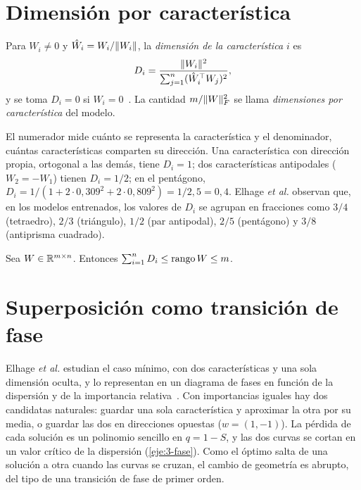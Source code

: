 \section{Dimensión por característica}

\begin{definicion}\label{def:dimension}
Para $W_i\neq 0$ y $\hat W_i=W_i/\lVert W_i\rVert$, la \emph{dimensión de la característica $i$} es
\[
D_i=\frac{\lVert W_i\rVert^{2}}{\sum_{j=1}^{n}(\hat W_i^{\top} W_j)^{2}},
\]
y se toma $D_i=0$ si $W_i=0$~\cite[«Feature Dimensionality»]{elhage22}. La cantidad $m/\lVert W\rVert_F^{2}$ se llama \emph{dimensiones por característica} del modelo.
\end{definicion}

El numerador mide cuánto se representa la característica y el denominador, cuántas características comparten su dirección. Una característica con dirección propia, ortogonal a las demás, tiene $D_i=1$; dos características antipodales ($W_2=-W_1$) tienen $D_i=1/2$; en el pentágono, $D_i=1/(1+2\cdot 0{,}309^{2}+2\cdot 0{,}809^{2})=1/2{,}5=0{,}4$. Elhage \emph{et al.} observan que, en los modelos entrenados, los valores de $D_i$ se agrupan en fracciones como $3/4$ (tetraedro), $2/3$ (triángulo), $1/2$ (par antipodal), $2/5$ (pentágono) y $3/8$ (antiprisma cuadrado).

\begin{proposicion}\label{prop:suma-dim}
Sea $W\in\mathbb{R}^{m\times n}$. Entonces $\sum_{i=1}^{n}D_i\le\operatorname{rango} W\le m$.
\end{proposicion}

\addtocounter{definicion}{1}%

\section{Superposición como transición de fase}

Elhage \emph{et al.} estudian el caso mínimo, con dos características y una sola dimensión oculta, y lo representan en un diagrama de fases en función de la dispersión y de la importancia relativa~\cite[«Superposition as a Phase Change»]{elhage22}. Con importancias iguales hay dos candidatas naturales: guardar una sola característica y aproximar la otra por su media, o guardar las dos en direcciones opuestas ($w=(1,-1)$). La pérdida de cada solución es un polinomio sencillo en $q=1-S$, y las dos curvas se cortan en un valor crítico de la dispersión (\cref{eje:3-fase}). Como el óptimo salta de una solución a otra cuando las curvas se cruzan, el cambio de geometría es abrupto, del tipo de una transición de fase de primer orden.

